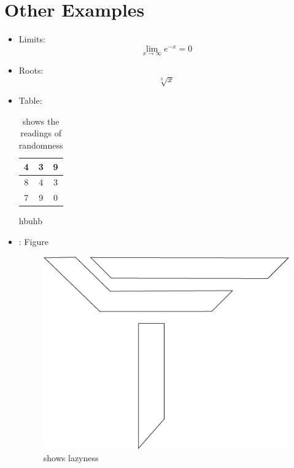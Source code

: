 \documentclass{article}
\begin{document}
   \section*{Other Examples}
   \begin{itemize}
      \item Limits:
         $$
         \lim_{x \to \infty} e^{-x} = 0
         $$
      \item Roots:
         $$
         \sqrt[3]{x}
         $$
      \item Table:
         \begin{table}[ht]
            \centering
            \begin{tabular}{|c|c|c|}
               \hline
               4 & 3 & 9 \\
               \hline
               8 & 4 & 3 \\
               \hline
               7 & 9 & 0 \\
               \hline
            \end{tabular}
            \caption{shows the readings of randomness}

         \end{table}
            
         
         hbuhb 
      \newpage
      \item : Figure
         \begin{figure}
            \caption{shows lazyness}
            \includegraphics{Untitled-1.png}
         \end{figure}
   \end{itemize}
\end{document}
